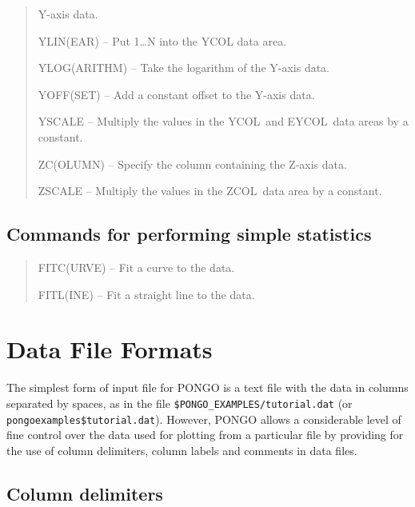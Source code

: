 \documentclass[twoside,11pt]{article}
\newcommand{\htmlref}[2]{#1}
\renewcommand{\_}{\texttt{\symbol{95}}}
\newcommand{\ycol}{{\sf YCOL}}
\newcommand{\eycol}{{\sf EYCOL}}
\newcommand{\zcol}{{\sf ZCOL}}
\newcommand{\iref} [1]{\htmlref{#1}{#1}}
\newcommand{\iiref}[2]{\htmlref{#1}{#2}}
\begin{document}
\begin {quote}
\begin {description}
    Y-axis data.
  \item [\iiref{YLIN(EAR)}{YLINEAR}] -- Put 1\ldots N into the YCOL data
    area.
  \item [\iiref{YLOG(ARITHM)}{YLOGARITHM}] -- Take the logarithm of the
    Y-axis data.
  \item [\iiref{YOFF(SET)}{YOFFSET}] -- Add a constant offset to the
    Y-axis data.
  \item [\iref{YSCALE}] -- Multiply the values in the \ycol\ and \eycol\ data areas
    by a constant.
  \item [\iiref{ZC(OLUMN)}{ZCOLUMN}] -- Specify the column containing the
    Z-axis data.
  \item [\iref{ZSCALE}] -- Multiply the values in the \zcol\ data area by a
    constant.
  \end {description}
\end {quote}
\normalsize


\subsection{Commands for performing simple statistics}

\small
\begin {quote}
  \begin {description}
  \item [\iiref{FITC(URVE)}{FITCURVE}] -- Fit a curve to the data.
  \item [\iiref{FITL(INE)}{FITLINE}] -- Fit a straight line to the data.
  \end {description}
\end {quote}
\normalsize


\section{Data File Formats} \label{data_sect}

The simplest form of input file for PONGO is a text file with the data
in columns separated by spaces, as in the file
\verb+$PONGO_EXAMPLES/tutorial.dat+ (or \verb+pongoexamples$tutorial.dat+).
However, PONGO allows a considerable level of fine control over the
data used for plotting from a particular file by providing for the use
of column delimiters, column labels and comments in data files.

\subsection{Column delimiters}
\end{document}
